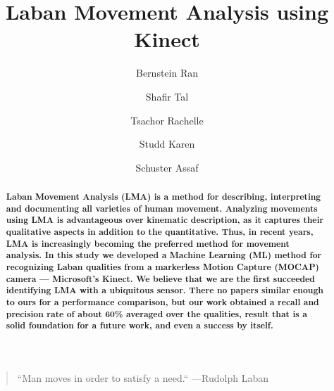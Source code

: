 \usepackage[margin=1.1in]{geometry}
\usepackage{graphicx}
\usepackage{csvsimple}
\usepackage{varwidth}
\usepackage{array}
\usepackage{float}
\usepackage{amsmath}
\usepackage{pgfplotstable}
\usepackage{amsmath }
\usepackage[T1]{fontenc}
\usepackage[compact]{titlesec}
\usepackage{authblk}

\author[1]{Bernstein Ran}
\author[2]{Shafir Tal}
\author[3]{Tsachor Rachelle}
\author[4]{Studd Karen}
\author[1]{Schuster Assaf}


\title{Laban Movement Analysis using Kinect}
\date{}
\maketitle
\begin{quote}{``Man moves in order to satisfy a need.`` ---\textup{Rudolph Laban}}
\end{quote}
\begin{abstract}
\textbf{Laban Movement Analysis (LMA) is a method for describing, interpreting
and documenting all varieties of human movement. 
Analyzing movements using LMA is advantageous over kinematic description, 
as it captures their qualitative aspects in addition to the quantitative. 
Thus, in recent years, LMA is increasingly becoming the preferred method for movement analysis. 
In this study we developed a Machine Learning (ML) method for recognizing Laban qualities from 
a markerless Motion Capture (MOCAP) camera --- Microsoft's Kinect. 
We believe that we are the first succeeded identifying LMA with a ubiquitous
sensor.
There no papers similar enough to ours for a performance comparison,
but our work obtained a recall and precision rate of about 60\%  averaged over
the qualities, result that is a solid foundation for a future work, and even a
success by itself.}
\end{abstract}

